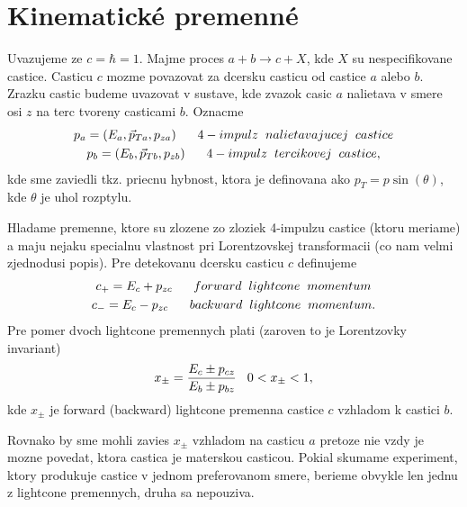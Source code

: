 \documentclass[../../main.tex]{subfiles}
\begin{document}
\section{Kinematické premenné}
Uvazujeme ze $c=\hbar=1$.\newline
Majme proces $a+b\rightarrow c+X$, kde $X$ su nespecifikovane castice. Casticu $c$ mozme povazovat za dcersku casticu od castice $a$ alebo $b$. Zrazku castic budeme uvazovat v sustave, kde zvazok casic $a$ nalietava v smere osi $z$ na terc tvoreny casticami $b$.\newline
Oznacme 
\begin{equation}
\begin{gathered}
p_a=(E_a,\vec{p}_{Ta},p_{za})\hspace{0.6cm} 4-impulz\hspace{0.2cm} nalietavajucej \hspace{0.2cm} castice \\
p_b=(E_b,\vec{p}_{Tb},p_{zb})\hspace{0.6cm} 4-impulz\hspace{0.2cm} tercikovej \hspace{0.2cm} castice,
\end{gathered}
\end{equation}
kde sme zaviedli tkz. priecnu hybnost, ktora je definovana ako $p_T=p\sin(\theta)$, kde $\theta$ je uhol rozptylu.\par
Hladame premenne, ktore su zlozene zo zloziek 4-impulzu castice (ktoru meriame) a maju nejaku specialnu vlastnost pri Lorentzovskej transformacii (co nam velmi zjednodusi popis). Pre detekovanu dcersku casticu $c$ definujeme
\begin{equation}
\begin{gathered}
c_+=E_c+p_{zc} \hspace{0.6cm} forward \hspace{0.2cm} lightcone \hspace{0.2cm} momentum \\
c_-=E_c-p_{zc} \hspace{0.6cm} backward \hspace{0.2cm} lightcone \hspace{0.2cm} momentum.
\end{gathered}
\end{equation}
Pre pomer dvoch lightcone premennych plati (zaroven to je Lorentzovky invariant)
$$ x_{\pm}=\frac{E_c\pm p_{cz}}{E_b\pm p_{bz}} \hspace{0.3cm} 0<x_{\pm}<1, $$ 
kde $x_{\pm}$ je forward (backward) lightcone premenna castice $c$ vzhladom k castici $b$.\par
Rovnako by sme mohli zavies $x_{\pm}$ vzhladom na casticu $a$ pretoze nie vzdy je mozne povedat, ktora castica je materskou casticou. Pokial skumame experiment, ktory produkuje castice v jednom preferovanom smere, berieme obvykle len jednu z lightcone premennych, druha sa nepouziva.\newline
\end{document}
